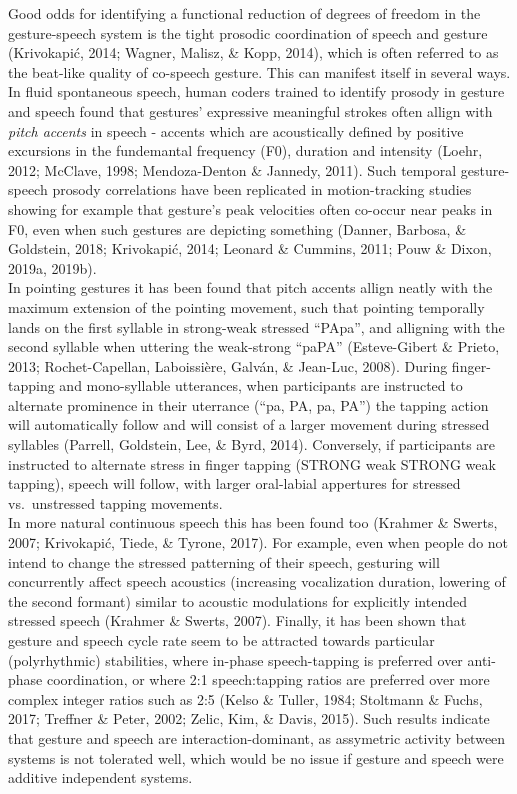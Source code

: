 \documentclass[
  man,floatsintext]{apa6}
\begin{document}
Good odds for identifying a functional reduction of degrees of freedom in the gesture-speech system is the tight prosodic coordination of speech and gesture (Krivokapić, 2014; Wagner, Malisz, \& Kopp, 2014), which is often referred to as the beat-like quality of co-speech gesture. This can manifest itself in several ways. In fluid spontaneous speech, human coders trained to identify prosody in gesture and speech found that gestures' expressive meaningful strokes often allign with \emph{pitch accents} in speech - accents which are acoustically defined by positive excursions in the fundemantal frequency (F0), duration and intensity (Loehr, 2012; McClave, 1998; Mendoza-Denton \& Jannedy, 2011). Such temporal gesture-speech prosody correlations have been replicated in motion-tracking studies showing for example that gesture's peak velocities often co-occur near peaks in F0, even when such gestures are depicting something (Danner, Barbosa, \& Goldstein, 2018; Krivokapić, 2014; Leonard \& Cummins, 2011; Pouw \& Dixon, 2019a, 2019b).\\
In pointing gestures it has been found that pitch accents allign neatly with the maximum extension of the pointing movement, such that pointing temporally lands on the first syllable in strong-weak stressed ``PApa'', and alligning with the second syllable when uttering the weak-strong ``paPA'' (Esteve-Gibert \& Prieto, 2013; Rochet-Capellan, Laboissière, Galván, \& Jean-Luc, 2008). During finger-tapping and mono-syllable utterances, when participants are instructed to alternate prominence in their uterrance (``pa, PA, pa, PA'') the tapping action will automatically follow and will consist of a larger movement during stressed syllables (Parrell, Goldstein, Lee, \& Byrd, 2014). Conversely, if participants are instructed to alternate stress in finger tapping (STRONG weak STRONG weak tapping), speech will follow, with larger oral-labial appertures for stressed vs.~unstressed tapping movements.\\
In more natural continuous speech this has been found too (Krahmer \& Swerts, 2007; Krivokapić, Tiede, \& Tyrone, 2017). For example, even when people do not intend to change the stressed patterning of their speech, gesturing will concurrently affect speech acoustics (increasing vocalization duration, lowering of the second formant) similar to acoustic modulations for explicitly intended stressed speech (Krahmer \& Swerts, 2007). Finally, it has been shown that gesture and speech cycle rate seem to be attracted towards particular (polyrhythmic) stabilities, where in-phase speech-tapping is preferred over anti-phase coordination, or where 2:1 speech:tapping ratios are preferred over more complex integer ratios such as 2:5 (Kelso \& Tuller, 1984; Stoltmann \& Fuchs, 2017; Treffner \& Peter, 2002; Zelic, Kim, \& Davis, 2015). Such results indicate that gesture and speech are interaction-dominant, as assymetric activity between systems is not tolerated well, which would be no issue if gesture and speech were additive independent systems.
\end{document}
